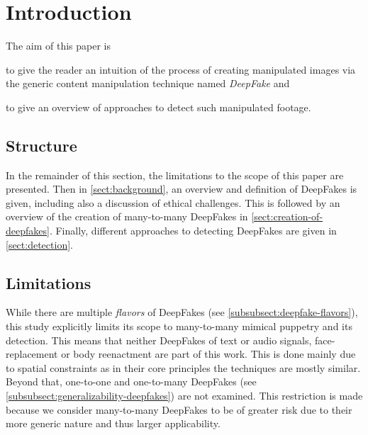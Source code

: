 \section{Introduction}
The aim of this paper is
\begin{enumerate*}[a.)]
    \item to give the reader an intuition of the process of creating manipulated
    images via the generic content manipulation technique named \textit{DeepFake}
    and
    \item to give an overview of approaches to detect such manipulated footage.
\end{enumerate*}

\subsection{Structure}
In the remainder of this section, the limitations to the scope of this paper are
presented. Then in \cref{sect:background}, an overview and definition of DeepFakes
is given, including also a discussion of ethical challenges.
This is followed by an overview of the creation of many-to-many DeepFakes in
\cref{sect:creation-of-deepfakes}. Finally, different approaches to detecting
DeepFakes are given in \cref{sect:detection}.

\subsection{Limitations}\label{subsect:limitations}
While there are multiple \textit{flavors} of DeepFakes (see \cref{subsubsect:deepfake-flavors}),
this study explicitly limits its scope to many-to-many mimical puppetry and its
detection. This means that neither DeepFakes of text or audio signals,
face-replacement or body reenactment are part of this work. This is done mainly
due to spatial constraints as in their core principles the techniques are mostly
similar. Beyond that, one-to-one and one-to-many DeepFakes (see \cref{subsubsect:generalizability-deepfakes})
are not examined. This restriction is made because we consider many-to-many DeepFakes
to be of greater risk due to their more generic nature and thus larger applicability.
